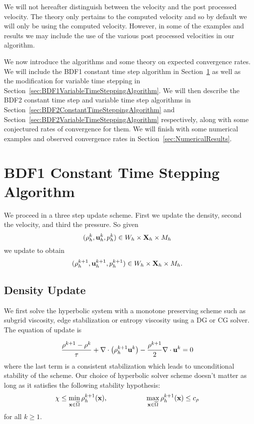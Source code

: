 \documentclass[letterpaper]{erdc}
\begin{document}
We will not hereafter distinguish between the velocity and the post processed velocity.  The theory only pertains to the computed velocity and so by default we will only be using the computed velocity.  However, in some of the examples and results we may include the use of the various post processed velocities in our algorithm.

We now introduce the algorithms and some theory on expected convergence rates.  We will include the BDF1 constant time step algorithm in Section~\ref{sec:BDF1ConstantTimeSteppingAlgorithm} as well as the modification for variable time stepping in Section~\ref{sec:BDF1VariableTimeSteppingAlgorithm}.  We will then describe the BDF2 constant time step and variable time step algorithms in Section~\ref{sec:BDF2ConstantTimeSteppingAlgorithm} and Section~\ref{sec:BDF2VariableTimeSteppingAlgorithm} respectively, along with some conjectured rates of convergence for them.  We will finish with some numerical examples and observed convergence rates in Section~\ref{sec:NumericalResults}.


%
%
\section{BDF1 Constant Time Stepping Algorithm}\label{sec:BDF1ConstantTimeSteppingAlgorithm}
We proceed in a three step update scheme.  First we update the density,  second the velocity, and third the pressure.  So given
\begin{equation}(\rho^{k}_h, \textbf{u}^{k}_{h}, p^{k}_h) \in W_h\times\textbf{X}_h\times M_h  \end{equation}
we update to obtain
\begin{equation}(\rho^{k+1}_h, \textbf{u}^{k+1}_{h}, p^{k+1}_h) \in W_h\times\textbf{X}_h\times M_h.\end{equation}

%
\subsection{Density Update}

We first solve the hyperbolic system with a monotone preserving scheme such as subgrid viscosity, edge stabilization or entropy viscosity using a DG or CG solver.  The equation of update is

\begin{equation}
  \frac{\rho^{k+1} - \rho^k}{\tau} + \nabla\cdot\left(\rho_h^{k+1}\textbf{u}^{k} \right) - \frac{\rho^{k+1}}{2}\nabla\cdot\textbf{u}^{k} = 0
\end{equation}
where the last term is a consistent stabilization which leads to unconditional stability of the scheme.   Our choice of hyperbolic solver scheme doesn't matter as long as it satisfies the following stability hypothesis:
\begin{equation}
  \chi \leq \displaystyle\min_{\textbf{x}\in\overline{\Omega}} \rho_h^{k+1}(\textbf{x}), \hspace{2cm} \displaystyle\max_{\textbf{x}\in\overline{\Omega}} \rho_{h}^{k+1}(\textbf{x}) \leq c_{\rho}
\end{equation}
for all $k\geq 1$.
\end{document}
